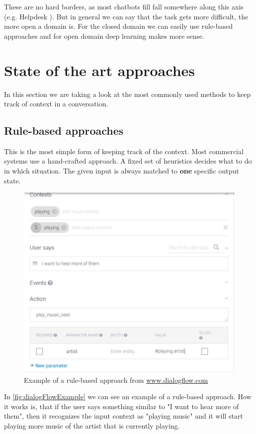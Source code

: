 \documentclass[conference]{IEEEtran}
\begin{document}
These are no hard borders, as most chatbots fill fall somewhere along this axis (e.g. Helpdesk ). But in general we can say that the task gets more difficult, the more open a domain is. For the closed domain we can easily use rule-based approaches and for open domain deep learning makes more sense. 




\section{State of the art approaches}
In this section we are taking a look at the most commonly used methods to keep track of context in a conversation.
\subsection{Rule-based approaches}
This is the most simple form of keeping track of the context. Most commercial systems use a hand-crafted approach\cite{williams2013dialog}. A fixed set of heuristics decides what to do in which situation. 
The given input is always matched to \textbf{one} specific output state. 

\begin{figure}[H]
\centering
   \includegraphics[width=\linewidth]{ruleBasedDialogflow.jpg}
  \caption{Example of a rule-based approach from \url{www.dialogflow.com}}
  \label{fig:dialogFlowExample}
\end{figure}

In \autoref{fig:dialogFlowExample} we can see an example of a rule-based approach. How it works is, that if the user says something similar to "I want to hear more of them", then it recognizes the input context as "playing music" and it will start playing more music of the artist that is currently playing.
\end{document}
